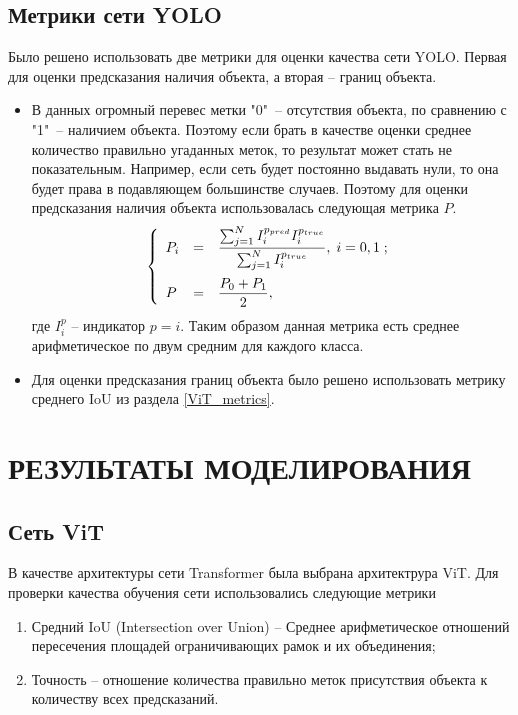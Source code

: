 \documentclass[14pt,a4paper]{extarticle}
\begin{document}
\subsection{Метрики сети YOLO}
Было решено использовать две метрики для оценки качества сети YOLO.
Первая для оценки предсказания наличия объекта, а вторая -- границ объекта.
\begin{itemize}
\item 
В данных огромный перевес метки "0"\, -- отсутствия объекта, по сравнению с "1"\, -- наличием объекта. Поэтому если брать в качестве оценки среднее количество правильно угаданных меток, то результат может стать не показательным. Например, если сеть будет постоянно выдавать нули, то она будет права в подавляющем большинстве случаев. Поэтому для оценки предсказания наличия объекта использовалась следующая метрика $P$.
\begin{equation}
\left\{\begin{array}{lcl}
\vspace*{0.2cm} P_i & = & \dfrac{\sum_{j=1}^N I^{p_{pred}}_iI^{p_{true}}_i}{\sum_{j=1}^N I^{p_{true}}_i},\; i = 0,1\;;\\
P & = & \dfrac{P_0+P_1}{2},
\end{array}
\right.
\end{equation}
где $I^{p}_i$ -- индикатор $p = i$. Таким образом данная метрика есть среднее арифметическое по двум средним для каждого класса.
\item Для оценки предсказания границ объекта было решено использовать метрику среднего IoU из раздела \ref{ViT_metrics}.
\end{itemize}
\newpage
\section{РЕЗУЛЬТАТЫ МОДЕЛИРОВАНИЯ}
\subsection{Сеть ViT}

В качестве архитектуры сети Transformer была выбрана архитектрура ViT.
Для проверки качества обучения сети использовались следующие метрики
\begin{enumerate}
\item Средний IoU (Intersection over Union) -- Среднее арифметическое отношений пересечения площадей ограничивающих рамок и их объединения;
\item Точность -- отношение количества правильно меток присутствия объекта к количеству всех предсказаний.
\end{enumerate}
\end{document}

